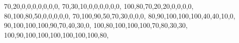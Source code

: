 {70,20,0,0,0,0,0,0,0},
{70,30,10,0,0,0,0,0,0},
{100,80,70,20,20,0,0,0,0},
{80,100,80,50,0,0,0,0,0},
{70,100,90,50,70,30,0,0,0},
{80,90,100,100,100,40,40,10,0},
{90,100,100,100,90,70,40,30,0},
{100,80,100,100,100,70,80,30,30},
{100,90,100,100,100,100,100,100,80},
